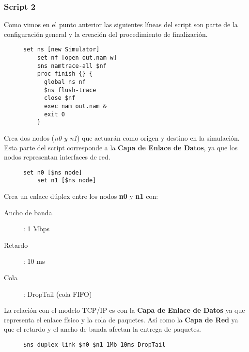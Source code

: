 \newpage

\subsubsection*{Script 2}

\noindent Como vimos en el punto anterior las siguientes l\'ineas del script son parte de la configuraci\'on general y la
creaci\'on del procedimiento de finalizaci\'on.
\begin{figure}[H]
  \centering
  \begin{lstlisting}[frame=single, breaklines=true, basicstyle=\footnotesize\ttfamily, breakatwhitespace=false, 
    columns=flexible, tabsize=2, showstringspaces=false]
    set ns [new Simulator]
    set nf [open out.nam w]
    $ns namtrace-all $nf
    proc finish {} {
      global ns nf
      $ns flush-trace
      close $nf
      exec nam out.nam &
      exit 0
    }
  \end{lstlisting}
\end{figure}

\noindent Crea dos nodos (\textit{n0 y n1}) que actuar\'an como origen y destino en la simulaci\'on. Esta parte del script corresponde a la
\textbf{Capa de Enlace de Datos}, ya que los nodos representan interfaces de red.
\begin{figure}[H]
  \centering
  \begin{lstlisting}[frame=single, breaklines=true, basicstyle=\footnotesize\ttfamily, breakatwhitespace=false, 
    columns=flexible, tabsize=2, showstringspaces=false]
    set n0 [$ns node]
    set n1 [$ns node]
  \end{lstlisting}
\end{figure}

\noindent Crea un enlace d\'uplex entre los nodos \textbf{n0} y \textbf{n1} con:
\begin{description}
  \item[Ancho de banda] : 1 Mbps
  \item[Retardo] : 10 ms
  \item[Cola] : DropTail (cola FIFO)   
\end{description}
La relaci\'on con el modelo TCP/IP es con la \textbf{Capa de Enlace de Datos} ya que representa el enlace f\'isico y la cola de paquetes.
As\'i como la \textbf{Capa de Red} ya que el retardo y el ancho de banda afectan la entrega de paquetes.
\begin{figure}[H]
  \centering
  \begin{lstlisting}[frame=single, breaklines=true, basicstyle=\footnotesize\ttfamily, breakatwhitespace=false, 
    columns=flexible, tabsize=2, showstringspaces=false]
    $ns duplex-link $n0 $n1 1Mb 10ms DropTail
  \end{lstlisting}
\end{figure}

